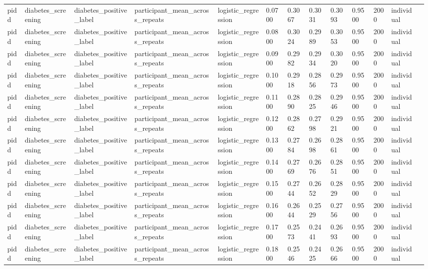 \begin{tabular}{lllllllllllll}
pidd & diabetes\_screening & diabetes\_positive\_label & participant\_mean\_across\_repeats & logistic\_regression & 0.0700 & 0.3067 & 0.3031 & 0.3093 & 0.9500 & 2000 & individual &  \\
pidd & diabetes\_screening & diabetes\_positive\_label & participant\_mean\_across\_repeats & logistic\_regression & 0.0800 & 0.3024 & 0.2989 & 0.3053 & 0.9500 & 2000 & individual &  \\
pidd & diabetes\_screening & diabetes\_positive\_label & participant\_mean\_across\_repeats & logistic\_regression & 0.0900 & 0.2982 & 0.2934 & 0.3020 & 0.9500 & 2000 & individual &  \\
pidd & diabetes\_screening & diabetes\_positive\_label & participant\_mean\_across\_repeats & logistic\_regression & 0.1000 & 0.2918 & 0.2856 & 0.2973 & 0.9500 & 2000 & individual &  \\
pidd & diabetes\_screening & diabetes\_positive\_label & participant\_mean\_across\_repeats & logistic\_regression & 0.1100 & 0.2890 & 0.2825 & 0.2946 & 0.9500 & 2000 & individual &  \\
pidd & diabetes\_screening & diabetes\_positive\_label & participant\_mean\_across\_repeats & logistic\_regression & 0.1200 & 0.2862 & 0.2798 & 0.2921 & 0.9500 & 2000 & individual &  \\
pidd & diabetes\_screening & diabetes\_positive\_label & participant\_mean\_across\_repeats & logistic\_regression & 0.1300 & 0.2784 & 0.2698 & 0.2861 & 0.9500 & 2000 & individual &  \\
pidd & diabetes\_screening & diabetes\_positive\_label & participant\_mean\_across\_repeats & logistic\_regression & 0.1400 & 0.2769 & 0.2676 & 0.2851 & 0.9500 & 2000 & individual &  \\
pidd & diabetes\_screening & diabetes\_positive\_label & participant\_mean\_across\_repeats & logistic\_regression & 0.1500 & 0.2744 & 0.2652 & 0.2829 & 0.9500 & 2000 & individual &  \\
pidd & diabetes\_screening & diabetes\_positive\_label & participant\_mean\_across\_repeats & logistic\_regression & 0.1600 & 0.2644 & 0.2529 & 0.2756 & 0.9500 & 2000 & individual &  \\
pidd & diabetes\_screening & diabetes\_positive\_label & participant\_mean\_across\_repeats & logistic\_regression & 0.1700 & 0.2573 & 0.2441 & 0.2693 & 0.9500 & 2000 & individual &  \\
pidd & diabetes\_screening & diabetes\_positive\_label & participant\_mean\_across\_repeats & logistic\_regression & 0.1800 & 0.2546 & 0.2425 & 0.2666 & 0.9500 & 2000 & individual &  \\

\end{tabular}
